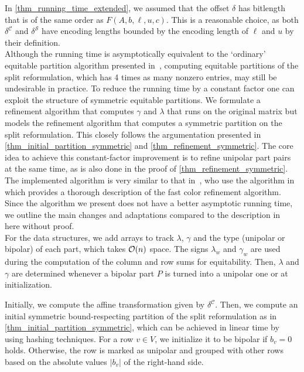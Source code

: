 \documentclass[pdflatex,sn-mathphys-num]{sn-jnl}%
\theoremstyle{thmstyleone}%
\theoremstyle{thmstylethree}%
\theoremstyle{thmstyletwo}%
\begin{document}
In \cref{thm_running_time_extended}, we assumed that the offset $\delta$ has bitlength that is of the same order as $F(A,b,\ell,u,c)$. This is a reasonable choice, as both $\delta^{\mathcal{C}}$ and $\delta^\mathcal{S}$ have encoding lengths bounded by the encoding length of $\ell$ and $u$ by their definition.\\

Although the running time is asymptotically equivalent to the `ordinary' equitable partition algorithm presented in~\cite{Grohe2014}, computing equitable partitions of the split reformulation, which has 4 times as many nonzero entries, may still be undesirable in practice. 
 To reduce the running time by a constant factor one can exploit the structure of symmetric equitable partitions. We formulate a refinement algorithm that computes $\gamma$ and $\lambda$ that runs on the original matrix but models the refinement algorithm that computes a symmetric partition on the split reformulation. This closely follows the argumentation presented in \cref{thm_initial_partition_symmetric} and \cref{thm_refinement_symmetric}. 
The core idea to achieve this constant-factor improvement is to refine unipolar part pairs at the same time, as is also done in the proof of \cref{thm_refinement_symmetric}.
The implemented algorithm is very similar to that in~\cite{Grohe2014}, who use the algorithm in~\cite{Berkholz2017} which provides a thorough description of the fast color refinement algorithm. Since the algorithm we present does not have a better asymptotic running time, we outline the main changes and adaptations compared to the description in~\cite{Grohe2014} here without proof.\\

For the data structures, we add arrays to track $\lambda$, $\gamma$ and the type (unipolar or bipolar) of each part, which takes $\orderO(n)$ space. The signs $\lambda_w$ and $\gamma_w$ are used during the computation of the column and row sums for equitability.
Then, $\lambda$ and $\gamma$ are determined whenever a bipolar part $P$ is turned into a unipolar one or at initialization. 

Initially, we compute the affine transformation given by $\delta^\mathcal{C}$. Then, we compute an initial symmetric bound-respecting partition of the split reformulation as in \cref{thm_initial_partition_symmetric}, which can be achieved in linear time by using hashing techniques.
For a row $v\in V$, we initialize it to be bipolar if $b_v = 0$ holds. Otherwise, the row is marked as unipolar and grouped with other rows based on the absolute values $|b_v|$ of the right-hand side.
\end{document}
